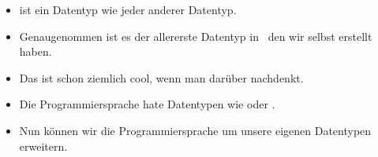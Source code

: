 \documentclass[aspectratio=169,mathserif,notheorems]{beamer}%
\begin{document}
\begin{frame}
{{\begin{itemize}
{}%
%
%
%
\item<49->  ist ein Datentyp wie jeder anderer Datentyp.%
%
\item<50-> Genaugenommen ist es der allererste Datentyp in \python\ den wir selbst erstellt haben.%
%
\item<51-> Das ist schon ziemlich cool, wenn man darüber nachdenkt.%
%
\item<52-> Die Programmiersprache hate Datentypen wie  oder .%
%
\item<53-> Nun können wir die Programmiersprache um unsere eigenen Datentypen erweitern.%
\end{itemize}%
}}%
%
%
\end{frame}%
%
\end{document}
